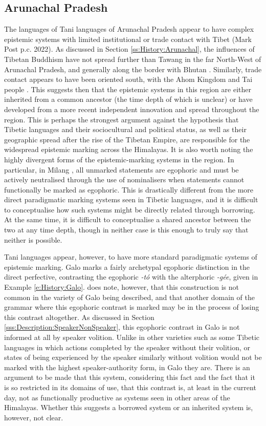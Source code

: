 \subsection{Arunachal Pradesh}
The languages of Tani languages of Arunachal Pradesh appear to have complex epistemic systems with limited institutional or trade contact with Tibet (Mark Post p.c. 2022). As discussed in Section \ref{ss:History:Arunachal}, the influences of Tibetan Buddhism have not spread further than Tawang in the far North-West of Arunachal Pradesh, and generally along the border with Bhutan \cite{Namgyal2020}. Similarly, trade contact appears to have been oriented south, with the Ahom Kingdom and Tai people \cite{Nyori1993}. This suggests then that the epistemic systems in this region are either inherited from a common ancestor (the time depth of which is unclear) or have developed from a more recent independent innovation and spread throughout the region. This is perhaps the strongest argument against the hypothesis that Tibetic languages and their sociocultural and political status, as well as their geographic spread after the rise of the Tibetan Empire, are responsible for the widespread epistemic marking across the Himalayas. It is also worth noting the highly divergent forms of the epistemic-marking systems in the region. In particular, in Milang \cite[Siangic,][]{Modi2017}, all unmarked statements are egophoric and must be actively neutralised through the use of nominalisers when statements cannot functionally be marked as egophoric. This is drastically different from the more direct paradigmatic marking systems seen in Tibetic languages, and it is difficult to conceptualise how such systems might be directly related through borrowing. At the same time, it is difficult to conceptualise a shared ancestor between the two at any time depth, though in neither case is this enough to truly say that neither is possible.

Tani languages appear, however, to have more standard paradigmatic systems of epistemic marking. Galo marks a fairly archetypal egophoric distinction in the direct perfective, contrasting the egophoric \textit{-tó} with the alterphoric \textit{-gée}, given in Example \ref{e:History:Galo}.  does note, however, that this construction is not common in the variety of Galo being described, and that another domain of the grammar where this egophoric contrast is marked may be in the process of losing this contrast altogether. As discussed in Section \ref{sss:Description:SpeakerNonSpeaker}, this egophoric contrast in Galo is not informed at all by speaker volition. Unlike in other varieties such as some Tibetic languages in which actions completed by the speaker without their volition, or states of being experienced by the speaker similarly without volition would not be marked with the highest speaker-authority form, in Galo they are. There is an argument to be made that this system, considering this fact and the fact that it is so restricted in its domains of use, that this contrast is, at least in the current day, not as functionally productive as systems seen in other areas of the Himalayas. Whether this suggests a borrowed system or an inherited system is, however, not clear.

